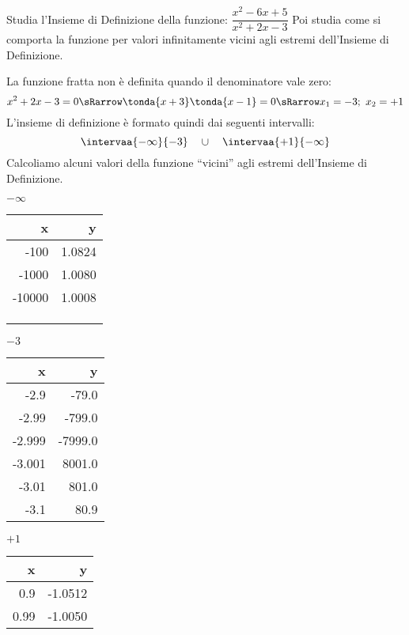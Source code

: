 \begin{esempio}
 Studia l'Insieme di Definizione della funzione: 
 \(\dfrac{x^2-6x+5}{x^2+2x-3}\)
 Poi studia come si comporta la funzione per valori infinitamente vicini 
agli estremi dell'Insieme di Definizione.

La funzione fratta non è definita quando il denominatore vale zero:
\[x^2+2x-3=0 \sRarrow \tonda{x+3}\tonda{x-1}=0 \sRarrow x_1=-3;~x_2=+1\]
L'insieme di definizione è formato quindi dai seguenti intervalli:
\[\intervaa{-\infty}{-3} \quad \cup \quad \intervaa{+1}{-\infty}\]
Calcoliamo alcuni valori della funzione ``vicini'' agli estremi 
dell'Insieme di Definizione.

\begin{minipage}{.24\textwidth}
\begin{center}
\(-\infty\)\\
\begin{tabular}{r|r}
x & y\\\hline
-100 & 1.0824 \\
-1000 & 1.0080 \\
-10000 & 1.0008 \\
&\\
&\\
&
\end{tabular}
\end{center}
\end{minipage}
\begin{minipage}{.24\textwidth}
\begin{center}
\(-3\)\\
\begin{tabular}{r|r}
x & y\\\hline
-2.9 & -79.0 \\
-2.99 & -799.0 \\
-2.999 & -7999.0 \\
-3.001 & 8001.0 \\
-3.01 & 801.0 \\
-3.1 & 80.9 \\
\end{tabular}
\end{center}
\end{minipage}
\begin{minipage}{.24\textwidth}
\begin{center}
\(+1\)\\
\begin{tabular}{r|r}
x & y\\\hline
0.9 & -1.0512\\
0.99 & -1.0050 \\

\end{tabular}
\end{center}
\end{minipage}
\end{esempio}

